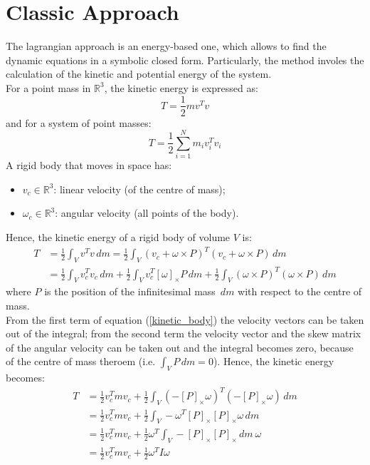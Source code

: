 \documentclass[a4paper,12pt,oneside]{report}
\begin{document}
\section{Classic Approach}
The lagrangian approach is an energy-based one, which allows to find the dynamic equations in a symbolic closed form. Particularly, the method involes the calculation of the kinetic and potential energy of the system.\\
For a point mass in $\mathbb{R} ^3$, the kinetic energy is expressed as:
\begin{equation}
  T=\frac{1}{2}mv^Tv
\end{equation}
and for a system of point masses:
\begin{equation}
  T=\frac{1}{2}\sum_{i=1}^N m_iv_i^Tv_i
\end{equation}
A rigid body that moves in space has:
\begin{itemize}
  \item $v_c \in \mathbb{R} ^3$: linear velocity (of the centre of mass);
  \item $\omega_c \in \mathbb{R} ^3$: angular velocity (all points of the body).
\end{itemize}
Hence, the kinetic energy of a rigid body of volume $V$ is:
\begin{equation}
  \begin{split}
  T&=\frac{1}{2}\int_{V}v^Tv\,dm=\frac{1}{2}\int_{V}(v_c+\omega\times P)^T(v_c+\omega \times P)\,dm\\
  & =\frac{1}{2}\int_{V}v_c^Tv_c\,dm+\frac{1}{2}\int_{V}v_c^T[\omega]_{\times}P\,dm+\frac{1}{2}\int_{V}(\omega \times P)^T(\omega \times P)\,dm
\end{split}
\label{kinetic_body}
\end{equation}
where $P$ is the position of the infinitesimal mass $\,dm$ with respect to the centre of mass.\\
From the first term of equation (\ref{kinetic_body}) the velocity vectors can be taken out of the integral; from the second term the velocity vector and the skew matrix of the angular velocity can be taken out and the integral becomes zero, because of the centre of mass theroem (i.e. $\int_{V}P\,dm=0$). Hence, the kinetic energy becomes:
\begin{equation}
  \begin{split}
    T&=\frac{1}{2}v_c^Tmv_c+\frac{1}{2}\int_{V}(-[P]_{\times}\omega)^T(-[P]_{\times}\omega)\,dm\\
    &=\frac{1}{2}v_c^Tmv_c+\frac{1}{2}\int_{V}-\omega^T[P]_{\times}[P]_{\times}\omega\,dm\\
    &=\frac{1}{2}v_c^Tmv_c+\frac{1}{2}\omega^T\int_{V}-[P]_{\times}[P]_{\times}\,dm \ \omega\\
    &=\frac{1}{2}v_c^Tmv_c+\frac{1}{2}\omega^T I \omega
  \end{split}
  \label{final_kinetic_body}
\end{equation}
\end{document}

